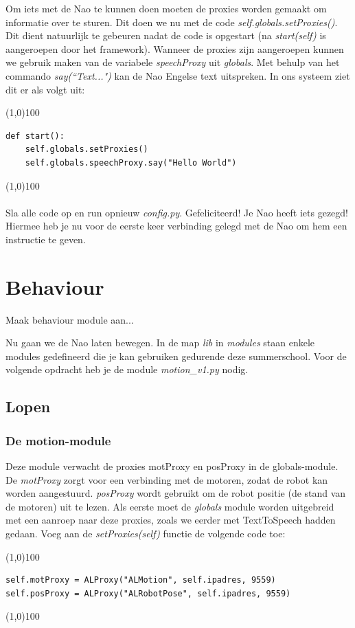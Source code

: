 \documentclass[a4paper, twoside]{article}
\begin{document}
Om iets met de Nao te kunnen doen moeten de proxies worden gemaakt om informatie over te sturen. Dit doen we nu met de code \textit{self.globals.setProxies()}. Dit dient natuurlijk te gebeuren nadat de code is opgestart (na \textit{start(self)} is aangeroepen door het framework).
Wanneer de proxies zijn aangeroepen kunnen we gebruik maken van de variabele \textit{speechProxy} uit \textit{globals}.
Met behulp van het commando \textit{say(``Text...")} kan de Nao Engelse text uitspreken. In ons systeem ziet dit er als volgt uit:

\noindent \line(1,0){100}
\begin{verbatim}
def start():
    self.globals.setProxies()
    self.globals.speechProxy.say("Hello World")
\end{verbatim}
\noindent \line(1,0){100}
\\\\
Sla alle code op en run opnieuw \textit{config.py}. Gefeliciteerd! Je Nao heeft iets gezegd! Hiermee heb je nu voor de eerste keer verbinding gelegd met de Nao om hem een instructie te geven.


\cleardoublepage
\section{Behaviour}
Maak behaviour module aan...

Nu gaan we de Nao laten bewegen.
In de map \textit{lib} in \textit{modules} staan enkele modules gedefineerd die je kan gebruiken gedurende deze summerschool.
Voor de volgende opdracht heb je de module \textit{motion\_v1.py} nodig.

\subsection{Lopen}
\subsubsection{De motion-module}
Deze module verwacht de proxies motProxy en posProxy in de globals-module. De \textit{motProxy} zorgt voor een verbinding met de motoren, zodat de robot kan worden aangestuurd. \textit{posProxy} wordt gebruikt om de robot positie (de stand van de motoren) uit te lezen. Als eerste moet de \textit{globals} module worden uitgebreid met een aanroep naar deze proxies, zoals we eerder met TextToSpeech hadden gedaan.
Voeg aan de \textit{setProxies(self)} functie de volgende code toe:

\noindent \line(1,0){100}
\begin{verbatim}
self.motProxy = ALProxy("ALMotion", self.ipadres, 9559)
self.posProxy = ALProxy("ALRobotPose", self.ipadres, 9559)
\end{verbatim}
\noindent \line(1,0){100}
\\\\
\end{document}
